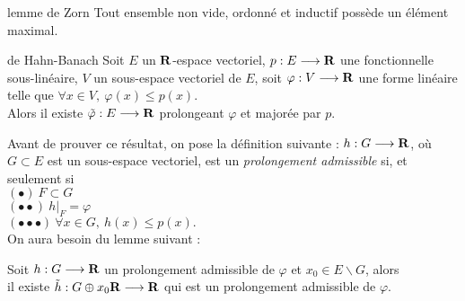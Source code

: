 \documentclass[a4paper,11pt, twoside]{article}
\begin{document}
\begin{thC}{lemme de Zorn}
  Tout ensemble non vide, ordonné et inductif possède un élément maximal.
\end{thC}


\begin{thC}{de Hahn-Banach}
  Soit $E$ un $\mathbf R$-espace vectoriel, $p:E\longrightarrow \mathbf R$ une fonctionnelle sous-linéaire, $V$ un sous-espace vectoriel de $E$, soit $\varphi:V\longrightarrow\mathbf R$ une forme linéaire telle que $\forall x\in V,\ \varphi(x)\leqslant p(x).$\\

  Alors il existe $\tilde\varphi:E\longrightarrow\mathbf R$ prolongeant $\varphi$ et majorée par $p$.
\end{thC}


Avant de prouver ce résultat, on pose la définition suivante : $h:G\longrightarrow\mathbf R$, où $G\subset E$ est un sous-espace vectoriel, est un \emph{prolongement admissible} si, et seulement si\\
$(\bullet)\ F\subset G$\\
$(\bullet\bullet)\ h\big|_F=\varphi$\\
$(\bullet\bullet\bullet)\ \forall x\in G,\ h(x)\leqslant p(x).$\\


On aura besoin du lemme suivant : 


\begin{lemme}
  Soit $h:G\longrightarrow\mathbf R$ un prolongement admissible de $\varphi$ et $x_0\in E\backslash G$, alors\\

  il existe $\tilde h:G\oplus x_0\mathbf R\longrightarrow\mathbf R$ qui est un prolongement admissible de $\varphi$.
\end{lemme}
\end{document}

